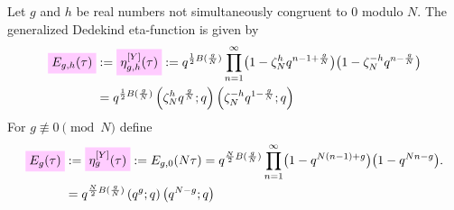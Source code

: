 \documentclass{article}
\begin{document}
\begin{Definition}
  \cite{Yang:GeneralizedDedekindEtaFunctions:2004}
  Let $g$ and $h$ be real numbers not simultaneously congruent to 0
  modulo $N$.
%
The generalized Dedekind eta-function is given by
\begin{align}
  \defineNotation[E-g-h-tau]{E_{g,h}(\tau)}
  &:=
  \defineNotation[eta-g-h-tau-Yang]{\eta_{g,h}^{[Y]}(\tau)}
  :=
  q^{\frac{1}{2} B(\frac{g}{N})}
  \prod_{n=1}^\infty
    \bigl(1-\zeta_N^h q^{n-1 + \frac{g}{N}}\bigr)
    \bigl(1-\zeta_N^{-h} q^{n - \frac{g}{N}}\bigr)
  \notag\\
  &=
  q^{\frac{1}{2} B(\frac{g}{N})}
    \left( \zeta_N^h q^{\frac{g}{N}}; q \right)
    \left( \zeta_N^{-h} q^{1-\frac{g}{N}}; q \right)
  \label{eq:eta_g-h^[Y](tau)}
\end{align}
For $g \not\equiv 0 \pmod{N}$ define
\begin{align}
  \defineNotation[E-g-tau]{E_g(\tau)}
  &:=
  \defineNotation[eta-g-tau-Yang]{\eta_g^{[Y]}(\tau)}
  :=
  E_{g,0}(N \tau)
  =
  q^{\frac{N}{2} B(\frac{g}{N})}
  \prod_{n=1}^\infty
    \bigl(1-q^{N (n-1) + g}\bigr)
    \bigl(1-q^{N n - g}\bigr).
  \notag\\
  &=
  q^{\frac{N}{2} B(\frac{g}{N})}
    \left( q^g; q \right)
    \left( q^{N-g}; q \right)
  \label{eq:eta_g^[Y](tau)}
\end{align}
\end{Definition}
\end{document}
